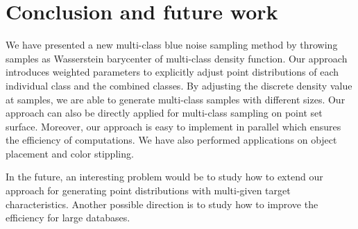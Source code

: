 \section{Conclusion and future work}
We have presented a new multi-class blue noise sampling method by
throwing samples as  Wasserstein barycenter of multi-class density function.
Our approach introduces weighted parameters to explicitly adjust point distributions of each individual class and the combined classes.
By adjusting the discrete density value at samples,
we are able to generate multi-class samples with different sizes.
Our approach can also be directly applied for multi-class sampling on point set surface.
Moreover, our approach is easy to implement in parallel which ensures the efficiency of computations.
We have also performed applications on object placement and color stippling.

In the future,
an interesting problem would be to study how to extend our approach for generating point distributions with multi-given target characteristics.
Another possible direction is to study how to improve the efficiency for large databases.
